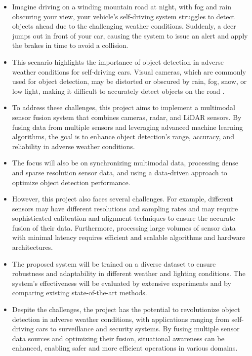 \documentclass[rnd]{mas_proposal}
\begin{document}
\begin{itemize}
    \item Imagine driving on a winding mountain road at night, with fog and rain obscuring your view, your vehicle's self-driving system struggles to detect objects ahead due to the challenging weather conditions. Suddenly, a deer jumps out in front of your car, causing the system to issue an alert and apply the brakes in time to avoid a collision.
    
    \item This scenario highlights the importance of object detection in adverse weather conditions for self-driving cars. Visual cameras, which are commonly used for object detection, may be distorted or obscured by rain, fog, snow, or low light, making it difficult to accurately detect objects on the road \cite{yurtsever2020survey} \cite{carballo2020libre} \cite{mcity2020}.
    
    \item To address these challenges, this project aims to implement a multimodal sensor fusion system that combines cameras, radar, and LiDAR sensors. By fusing data from multiple sensors and leveraging advanced machine learning algorithms, the goal is to enhance object detection's range, accuracy, and reliability in adverse weather conditions.
    
    \item The focus will also be on synchronizing multimodal data, processing dense and sparse resolution sensor data, and using a data-driven approach to optimize object detection performance.
    
    \item However, this project also faces several challenges. For example, different sensors may have different resolutions and sampling rates and may require sophisticated calibration and alignment techniques to ensure the accurate fusion of their data. Furthermore, processing large volumes of sensor data with minimal latency requires efficient and scalable algorithms and hardware architectures.
    
    \item The proposed system will be trained on a diverse dataset to ensure robustness and adaptability in different weather and lighting conditions. The system's effectiveness will be evaluated by extensive experiments and by comparing existing state-of-the-art methods.
    
    \item Despite the challenges, the project has the potential to revolutionize object detection in adverse weather conditions, with applications ranging from self-driving cars to surveillance and security systems. By fusing multiple sensor data sources and optimizing their fusion, situational awareness can be enhanced, enabling safer and more efficient operations in various domains.
    

\end{itemize}
\end{document}
